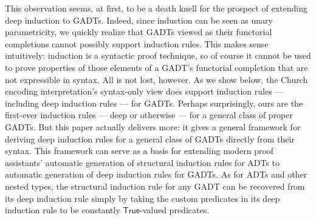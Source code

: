 \documentclass[9pt]{entcs}
\begin{document}
This observation seems, at first, to be a death knell for the prospect
of extending deep induction to GADTs. Indeed, since induction can be
seen as unary parametricity, we quickly realize that GADTs viewed as
their functorial completions cannot possibly support induction rules.
This makes sense intuitively: induction is a syntactic proof
technique, so of course it cannot be used to prove properties of those
elements of a GADT's functorial completion that are not expressible in
syntax. All is not lost, however. As we show below, the Church
encoding interpretation's syntax-only view does support induction
rules --- including deep induction rules --- for GADTs. Perhaps
surprisingly, ours are the first-ever induction rules --- deep or
otherwise --- for a general class of proper GADTs. But this paper
actually delivers more: it gives a general framework for deriving deep
induction rules for a general class of GADTs directly from their
syntax. This framework can serve as a basis for extending modern proof
assistants' automatic generation of structural induction rules for
ADTs to automatic generation of deep induction rules for GADTs. As
for ADTs and other nested types, the structural induction rule for any
GADT can be recovered from its deep induction rule simply by taking
the custom predicates in its deep induction rule to be constantly
$\mathsf{True}$-valued predicates.
\end{document}
